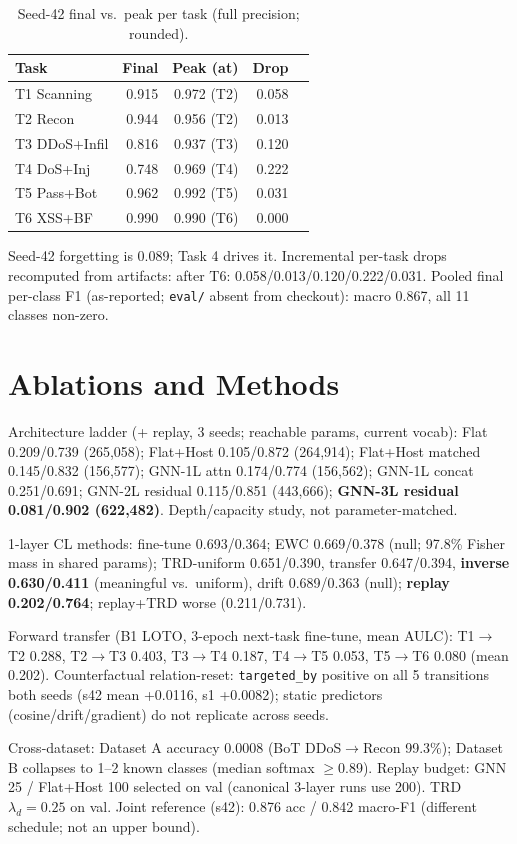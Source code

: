 \documentclass[10pt,a4paper,twocolumn]{article}
\begin{document}
\begin{table}[htbp]
\centering\footnotesize
\caption{Seed-42 final vs.\ peak per task (full precision; rounded).}
\label{tab:peak}
\begin{tabular}{lrrrr}
\toprule
Task & Final & Peak (at) & Drop \\
\midrule
T1 Scanning & 0.915 & 0.972 (T2) & 0.058 \\
T2 Recon & 0.944 & 0.956 (T2) & 0.013 \\
T3 DDoS+Infil & 0.816 & 0.937 (T3) & 0.120 \\
T4 DoS+Inj & 0.748 & 0.969 (T4) & 0.222 \\
T5 Pass+Bot & 0.962 & 0.992 (T5) & 0.031 \\
T6 XSS+BF & 0.990 & 0.990 (T6) & 0.000 \\
\bottomrule
\end{tabular}
\end{table}
Seed-42 forgetting is \num{0.089}; Task 4 drives it. Incremental per-task drops recomputed from artifacts: after T6: 0.058/0.013/0.120/0.222/0.031. Pooled final per-class F1 (as-reported; \texttt{eval/} absent from checkout): macro 0.867, all 11 classes non-zero.

\section{Ablations and Methods}
Architecture ladder (+ replay, 3 seeds; reachable params, current vocab): Flat 0.209/0.739 (265,058); Flat+Host 0.105/0.872 (264,914); Flat+Host matched 0.145/0.832 (156,577); GNN-1L attn 0.174/0.774 (156,562); GNN-1L concat 0.251/0.691; GNN-2L residual 0.115/0.851 (443,666); \textbf{GNN-3L residual 0.081/0.902 (622,482)}. Depth/capacity study, not parameter-matched.

1-layer CL methods: fine-tune 0.693/0.364; EWC 0.669/0.378 (null; 97.8\% Fisher mass in shared params); TRD-uniform 0.651/0.390, transfer 0.647/0.394, \textbf{inverse 0.630/0.411} (meaningful vs.\ uniform), drift 0.689/0.363 (null); \textbf{replay 0.202/0.764}; replay+TRD worse (0.211/0.731).

Forward transfer (B1 LOTO, 3-epoch next-task fine-tune, mean AULC): T1$\to$T2 0.288, T2$\to$T3 0.403, T3$\to$T4 0.187, T4$\to$T5 0.053, T5$\to$T6 0.080 (mean 0.202). Counterfactual relation-reset: \texttt{targeted\_by} positive on all 5 transitions both seeds (s42 mean +0.0116, s1 +0.0082); static predictors (cosine/drift/gradient) do not replicate across seeds.

Cross-dataset: Dataset A accuracy \num{0.0008} (BoT DDoS$\to$Recon 99.3\%); Dataset B collapses to 1--2 known classes (median softmax $\ge$0.89). Replay budget: GNN 25 / Flat+Host 100 selected on val (canonical 3-layer runs use 200). TRD $\lambda_d=0.25$ on val. Joint reference (s42): 0.876 acc / 0.842 macro-F1 (different schedule; not an upper bound).
\end{document}
